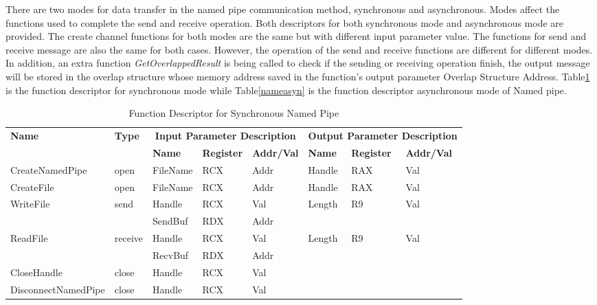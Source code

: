 There are two modes for data transfer in the named pipe communication method, synchronous and asynchronous.  Modes affect the functions used to complete the send and receive operation. Both descriptors for both synchronous mode and asynchronous mode are provided. The create channel functions for both modes are the same but with different input parameter value. The functions for send and receive message are also the same for both cases. However, the operation of the send and receive functions are different for different modes. In addition, an extra function \textit{GetOverlappedResult} is being called to check if the sending or receiving operation finish, the output message will be stored in the overlap structure whose memory address saved in the function's output parameter Overlap Structure Address. Table\ref{namesyn} is the function descriptor for synchronous mode while Table\ref{nameasyn} is the function descriptor asynchronous mode of Named pipe.

\begin{table}[H]
  \centering
  \caption{Function Descriptor for Synchronous Named Pipe}
  \label{namesyn}
  \begin{tabular}{|l|l|l|l|l|l|l|l|}
\hline
             \multirow{2}{*}{{\textbf{Name}}} & \multirow{2}{*}{{\textbf{Type}}} & \multicolumn{3}{c|}{\textbf{Input Parameter Description}} & \multicolumn{3}{c|}{\textbf{Output Parameter Description}} \\
              \cline{3-8} 
             & & \textbf{Name}& \textbf{Register} & \textbf{Addr/Val} & \textbf{Name}& \textbf{Register} &  \textbf{Addr/Val}  \\
             \hline
      CreateNamedPipe
       &open & FileName & RCX  & Addr &  Handle & RAX & Val\\
      \hline         
      CreateFile
       &open & FileName & RCX & Addr&  Handle & RAX & Val\\ 
      \hline              
      \multirow{2}{*}{WriteFile}
       &\multirow{2}{*}{send} &  Handle & RCX & Val & \multirow{2}{*}{Length} & \multirow{2}{*}{R9} & \multirow{2}{*}{Val}\\
        \cline{3-5} 
       & & SendBuf & RDX & Addr & & &\\
      \hline            
      \multirow{2}{*}{ReadFile}
       &\multirow{2}{*}{receive} &  Handle & RCX & Val& \multirow{2}{*}{Length} & \multirow{2}{*}{R9} & \multirow{2}{*}{Val}\\
        \cline{3-5} 
       & & RecvBuf & RDX  & Addr & & &\\
      \hline            
      CloseHandle &
       close &  Handle & RCX & Val & & &\\
      \hline            
      DisconnectNamedPipe &
      close &  Handle & RCX & Val & & &\\
      \hline               
  \end{tabular}
\end{table}

